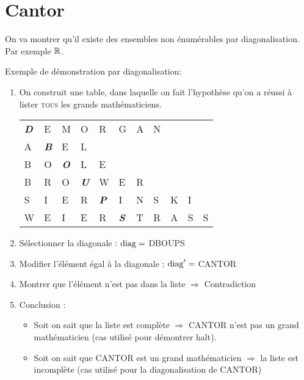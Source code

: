 
\section{Cantor}
\label{sec:cantor}
On va montrer qu'il existe des ensembles non énumérables par diagonalisation. Par exemple $\mathbb{R}$.
\begin{myexem}
	Exemple de démonstration par diagonalisation:
	\begin{enumerate}
		\item On construit une table, dans laquelle on fait l'hypothèse qu'on a réussi à lister \textsc{tous} les grands mathématiciens.\\
			\begin{tabular}{lllllllllll}
				\emph{\textbf{D}}&E& M&O&R&G&A&N&&& \\
				A&\emph{\textbf{B}}&E&L&&&&&&&\\
				B&O&\emph{\textbf{O}}&L&E&&&&&&\\
				B&R&O&\emph{\textbf{U}}&W&E&R&&&&\\
				S&I&E&R&\emph{\textbf{P}}&I&N&S&K&I&\\
				W&E&I&E&R&\emph{\textbf{S}}&T&R&A&S&S\\
			\end{tabular}
		\item Sélectionner la diagonale : $\operatorname{diag} = $ DBOUPS
		\item Modifier l'élément égal à la diagonale : $\operatorname{diag}' =$ CANTOR
		\item Montrer que l'élément n'est pas dans la liste $\Rightarrow$ Contradiction
		\item Conclusion :
			\begin{itemize}
				\item Soit on sait que la liste est complète
					\subitem $ \Rightarrow$ CANTOR n'est pas un grand
				mathématicien (cas utilisé pour démontrer
				halt).
				\item Soit on sait que CANTOR est un grand
					mathématicien
					\subitem $ \Rightarrow$ la liste est incomplète
				(cas utilisé pour la diagonalisation de CANTOR)
			\end{itemize}
	\end{enumerate}
\end{myexem}

